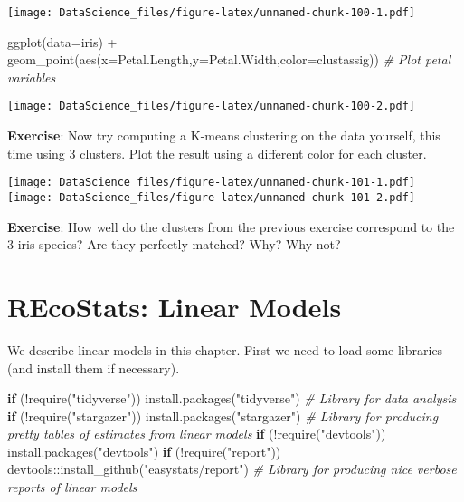 \documentclass[
]{book}
\newenvironment{Shaded}{\begin{snugshade}}{\end{snugshade}}
\newcommand{\AttributeTok}[1]{\textcolor[rgb]{0.77,0.63,0.00}{#1}}
\newcommand{\CommentTok}[1]{\textcolor[rgb]{0.56,0.35,0.01}{\textit{#1}}}
\newcommand{\ControlFlowTok}[1]{\textcolor[rgb]{0.13,0.29,0.53}{\textbf{#1}}}
\newcommand{\FunctionTok}[1]{\textcolor[rgb]{0.00,0.00,0.00}{#1}}
\newcommand{\NormalTok}[1]{#1}
\newcommand{\SpecialCharTok}[1]{\textcolor[rgb]{0.00,0.00,0.00}{#1}}
\newcommand{\StringTok}[1]{\textcolor[rgb]{0.31,0.60,0.02}{#1}}
\begin{document}
\texttt{[image: DataScience\_files/figure-latex/unnamed-chunk-100-1.pdf]}

\begin{Shaded}
\begin{Highlighting}[]
\FunctionTok{ggplot}\NormalTok{(}\AttributeTok{data=}\NormalTok{iris) }\SpecialCharTok{+} \FunctionTok{geom\_point}\NormalTok{(}\FunctionTok{aes}\NormalTok{(}\AttributeTok{x=}\NormalTok{Petal.Length,}\AttributeTok{y=}\NormalTok{Petal.Width,}\AttributeTok{color=}\NormalTok{clustassig)) }\CommentTok{\# Plot petal variables}
\end{Highlighting}
\end{Shaded}

\texttt{[image: DataScience\_files/figure-latex/unnamed-chunk-100-2.pdf]}

\textbf{Exercise}: Now try computing a K-means clustering on the data yourself, this time using 3 clusters. Plot the result using a different color for each cluster.

\texttt{[image: DataScience\_files/figure-latex/unnamed-chunk-101-1.pdf]} \texttt{[image: DataScience\_files/figure-latex/unnamed-chunk-101-2.pdf]}

\textbf{Exercise}: How well do the clusters from the previous exercise correspond to the 3 iris species? Are they perfectly matched? Why? Why not?

\hypertarget{recostats-linear-models}{%
\chapter{REcoStats: Linear Models}\label{recostats-linear-models}}

We describe linear models in this chapter. First we need to load some libraries (and install them if necessary).

\begin{Shaded}
\begin{Highlighting}[]
\ControlFlowTok{if}\NormalTok{ (}\SpecialCharTok{!}\FunctionTok{require}\NormalTok{(}\StringTok{"tidyverse"}\NormalTok{)) }\FunctionTok{install.packages}\NormalTok{(}\StringTok{"tidyverse"}\NormalTok{) }\CommentTok{\# Library for data analysis}
\ControlFlowTok{if}\NormalTok{ (}\SpecialCharTok{!}\FunctionTok{require}\NormalTok{(}\StringTok{"stargazer"}\NormalTok{)) }\FunctionTok{install.packages}\NormalTok{(}\StringTok{"stargazer"}\NormalTok{) }\CommentTok{\# Library for producing pretty tables of estimates from linear models}
\ControlFlowTok{if}\NormalTok{ (}\SpecialCharTok{!}\FunctionTok{require}\NormalTok{(}\StringTok{"devtools"}\NormalTok{)) }\FunctionTok{install.packages}\NormalTok{(}\StringTok{"devtools"}\NormalTok{)}
\ControlFlowTok{if}\NormalTok{ (}\SpecialCharTok{!}\FunctionTok{require}\NormalTok{(}\StringTok{"report"}\NormalTok{)) devtools}\SpecialCharTok{::}\FunctionTok{install\_github}\NormalTok{(}\StringTok{"easystats/report"}\NormalTok{) }\CommentTok{\# Library for producing nice verbose reports of linear models}
\end{Highlighting}
\end{Shaded}
\end{document}
